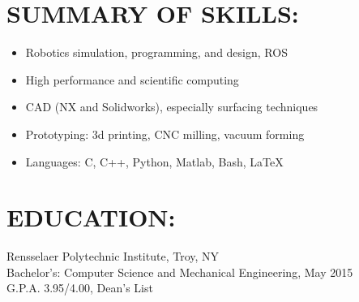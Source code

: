 \begin{resume}                        
\vspace{-1.5mm}
\section{SUMMARY OF SKILLS:}
\vspace{10mm}
  \begin{itemize}
    \item Robotics simulation, programming, and design, ROS
    \item High performance and scientific computing
    \item CAD (NX and Solidworks), especially surfacing techniques
    \item Prototyping: 3d printing, CNC milling, vacuum forming
    \item Languages: C, C++, Python, Matlab, Bash, \LaTeX
	\end{itemize}
\vspace{-3.5mm}
\section{EDUCATION:}
	Rensselaer Polytechnic Institute, Troy, NY \\
	Bachelor's: Computer Science and Mechanical Engineering, May 2015 \\
	G.P.A. 3.95/4.00, Dean's List
\vspace{-4.5mm}

\end{resume}

